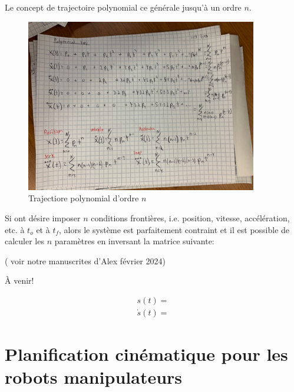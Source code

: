 Le concept de trajectoire polynomial ce générale jusqu'à un ordre $n$.

\begin{figure}[ht]
        \centering
		\includegraphics[width=0.90\textwidth]{fig/polynomial_traj_draft.jpg}
        \caption{Trajectiore polynomial d'ordre $n$}
		\label{fig:poly_n}
\end{figure}

Si ont désire imposer $n$ conditions frontières, i.e. position, vitesse, accélération, etc. à $t_o$ et à $t_f$, alors le système est parfaitement contraint et il est possible de calculer les $n$ paramètres en inversant la matrice suivante:

( voir notre manuscrites d'Alex février 2024)

À venir!

\begin{align}
s(t) = 
\\
\dot{s}(t) = 
\end{align}





\newpage
\section{Planification cinématique pour les robots manipulateurs}

